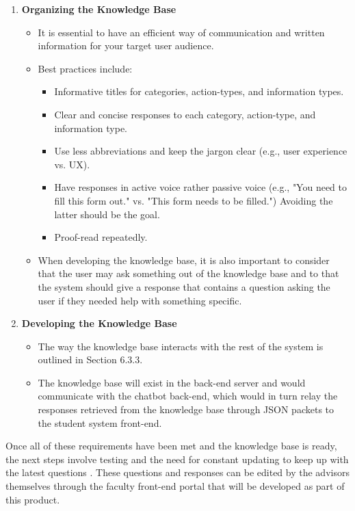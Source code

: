 \documentclass[titlepage, 12pt]{article}
\begin{document}
\begin{enumerate}
\begin{itemize}
    \end{itemize}
    \item \textbf{Organizing the Knowledge Base}
    \begin{itemize}
        \item It is essential to have an efficient way of communication and written information for your target user audience.
        \item Best practices include:
        \begin{itemize}
            \item Informative titles for categories, action-types, and information types.
            \item Clear and concise responses to each category, action-type, and information type.
            \item Use less abbreviations and keep the jargon clear (e.g., user experience vs. UX).
            \item Have responses in active voice rather passive voice (e.g., "You need to fill this form out." vs. "This form needs to be filled.") Avoiding the latter should be the goal.
            \item Proof-read repeatedly.
        \end{itemize}
        \item When developing the knowledge base, it is also important to consider that the user may ask something out of the knowledge base and to that the system should give a response that contains a question asking the user if they needed help with something specific.
    \end{itemize}
    \item \textbf{Developing the Knowledge Base}
    \begin{itemize}
        \item The way the knowledge base interacts with the rest of the system is outlined in Section 6.3.3. 
        \item The knowledge base will exist in the back-end server and would communicate with the chatbot back-end, which would in turn relay the responses retrieved from the knowledge base through JSON packets to the student system front-end.
    \end{itemize}
\end{enumerate}

Once all of these requirements have been met and the knowledge base is ready, the next steps involve testing and the need for constant updating to keep up with the latest questions \cite{bib-2-12}. These questions and responses can be edited by the advisors themselves through the faculty front-end portal that will be developed as part of this product.
\end{document}
